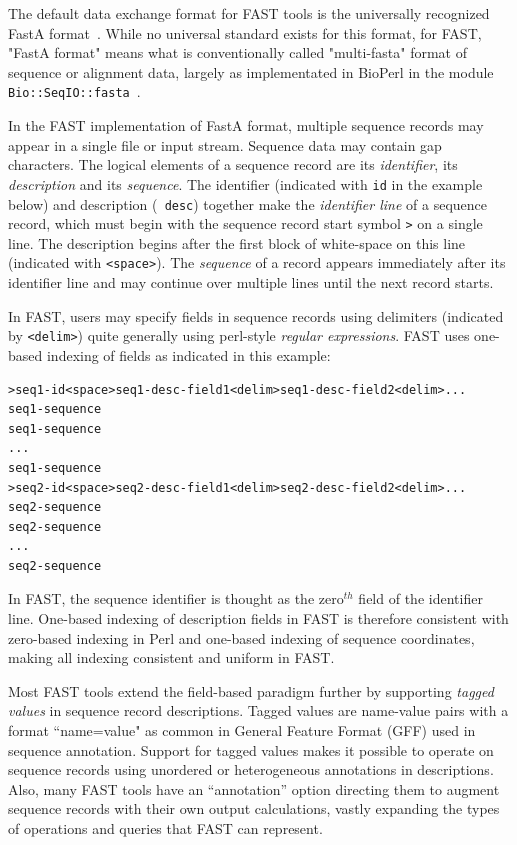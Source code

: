 \documentclass{frontiersSCNS} %
\begin{document}
The default data exchange format for FAST tools is the universally
recognized FastA format~\citep{lipman1985rapid}. While no universal
standard exists for this format, for FAST, "FastA format" means what
is conventionally called "multi-fasta" format of sequence or alignment
data, largely as implementated in BioPerl in the module {\tt
  Bio::SeqIO::fasta}~\citep{Stajich2002}.

In the FAST implementation of FastA format, multiple sequence records
may appear in a single file or input stream. Sequence data may contain
gap characters. The logical elements of a sequence record are its {\it
  identifier}, its {\it description} and its {\it sequence}. The identifier
(indicated with {\tt id} in the example below) and description ({\tt
  desc}) together make the {\it identifier line} of a sequence record,
which must begin with the sequence record start symbol {\tt >} on a
single line. The description begins after the first block of
white-space on this line (indicated with {\tt <space>}). The {\it
  sequence} of a record appears immediately after its identifier line
and may continue over multiple lines until the next record starts.

In FAST, users may specify fields in sequence records using delimiters
(indicated by {\tt <delim>}) quite generally using perl-style
{\it regular expressions}. FAST uses one-based indexing of fields as
indicated in this example:

\begin{verbatim}
>seq1-id<space>seq1-desc-field1<delim>seq1-desc-field2<delim>...
seq1-sequence
seq1-sequence
...
seq1-sequence
>seq2-id<space>seq2-desc-field1<delim>seq2-desc-field2<delim>...
seq2-sequence
seq2-sequence
...
seq2-sequence
\end{verbatim}

In FAST, the sequence identifier is thought as the zero$^{th}$ field
of the identifier line. One-based indexing of description fields in
FAST is therefore consistent with zero-based indexing in Perl and
one-based indexing of sequence coordinates, making all indexing
consistent and uniform in FAST.

Most FAST tools extend the field-based paradigm further by supporting
{\it tagged values} in sequence record descriptions. Tagged values are
name-value pairs with a format ``name=value" as common in General
Feature Format (GFF) used in sequence annotation. Support for tagged
values makes it possible to operate on sequence records using
unordered or heterogeneous annotations in descriptions.  Also, many
FAST tools have an ``annotation'' option directing them to augment
sequence records with their own output calculations, vastly expanding
the types of operations and queries that FAST can represent.
\end{document}
